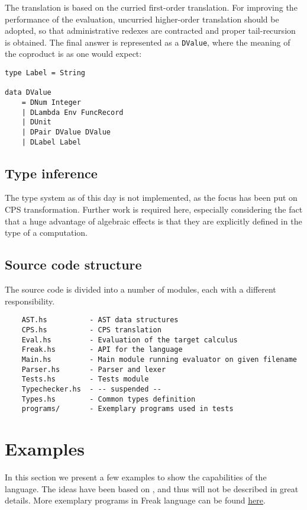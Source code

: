 \documentclass{article}
\theoremstyle{definition}
\theoremstyle{lemma}
\theoremstyle{observation}
\theoremstyle{theorem}
\begin{document}
    The translation is based on the curried first-order translation. For
    improving the performance of the evaluation, uncurried higher-order translation
    should be adopted, so that administrative redexes are contracted and
    proper tail-recursion is obtained. The final answer is represented as a \verb!DValue!,
    where the meaning of the coproduct is as one would expect:

    \begin{verbatim}
type Label = String

data DValue
    = DNum Integer
    | DLambda Env FuncRecord
    | DUnit
    | DPair DValue DValue
    | DLabel Label
    \end{verbatim}


    \subsection{Type inference}

    The type system as of this day is not implemented, as the focus has been put
    on CPS transformation. Further work is required here, especially considering
    the fact that a huge advantage of algebraic effects is that they are explicitly
    defined in the type of a computation.

    \subsection{Source code structure}

    The source code is divided into a number of modules, each with a different
    responsibility.

    \begin{verbatim}
    AST.hs          - AST data structures
    CPS.hs          - CPS translation
    Eval.hs         - Evaluation of the target calculus
    Freak.hs        - API for the language
    Main.hs         - Main module running evaluator on given filename
    Parser.hs       - Parser and lexer
    Tests.hs        - Tests module
    Typechecker.hs  - -- suspended --
    Types.hs        - Common types definition
    programs/       - Exemplary programs used in tests
    \end{verbatim}

\section{Examples}
\label{sec:examples}

    In this section we present a few examples to show the capabilities of the
    language. The ideas have been based on \cite{programming-in-eff}, and thus will not be
    described in great details. More exemplary programs in Freak language can
    be found \href{https://github.com/Tomatosoup97/freak/tree/master/src/programs}{\underline{here}}.
\end{document}

